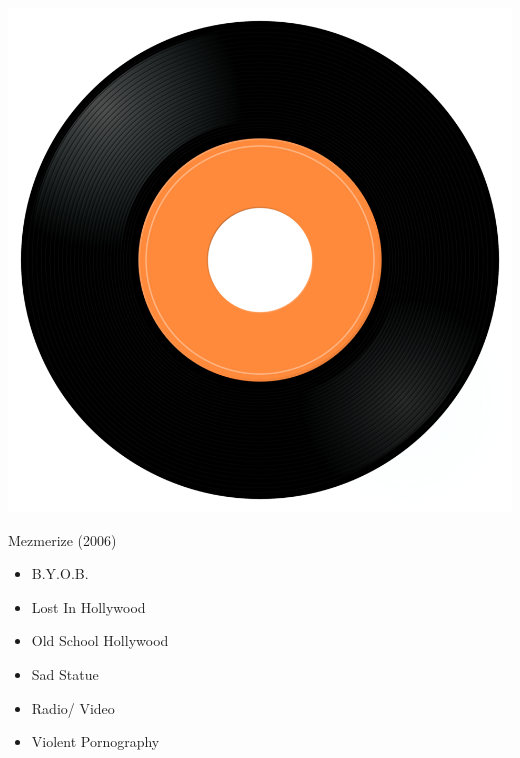 \begin{minipage}[t]{0.25\textwidth}
\captionsetup{type=figure}
\includegraphics[width=\textwidth]{Images/cover.png}
\caption*{Mezmerize (2006)}
\end{minipage}
\begin{minipage}[t]{0.25\textwidth}\vspace{0pt}
\begin{itemize}[nosep,leftmargin=1em,labelwidth=*,align=left]
	\setlength{\itemsep}{0pt}
	\item B.Y.O.B.
	\item Lost In Hollywood
	\item Old School Hollywood
	\item Sad Statue
	\item Radio/ Video
	\item Violent Pornography
\end{itemize}
\end{minipage}
